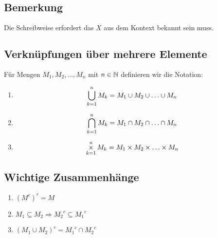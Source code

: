 \subsection{Bemerkung}
Die Schreibweise erfordert das $X$ aus dem Kontext bekannt sein muss.

\subsection{Verknüpfungen über mehrere Elemente}
Für Mengen $M_1, M_2, \ldots, M_n$ mit $n \in \mathbb{N}$ definieren wir die Notation:
\begin{enumerate}[label= (\alph*)]
    \item
        \begin{equation*}
            \mathop{\bigcup}\displaylimits_{k=1}^n M_k = M_1 \cup M_2 \cup \ldots \cup M_n
        \end{equation*}
    \item
        \begin{equation*}
            \mathop{\bigcap}\displaylimits_{k=1}^n M_k = M_1 \cap M_2 \cap \ldots \cap M_n
        \end{equation*}
    \item
        \begin{equation*}
            \mathop{\times}\displaylimits_{k=1}^n M_k = M_1 \times M_2 \times \ldots \times M_n
        \end{equation*}
\end{enumerate}

\subsection{Wichtige Zusammenhänge}
\begin{enumerate}[label= (\alph*)]
    \item ${(M^c)}^c = M$
    \item $M_1 \subseteq M_2 \Rightarrow {M_2}^c \subseteq {M_1}^c$
    \item ${(M_1 \cup M_2)}^c = {M_1}^c \cap {M_2}^c$
\end{enumerate}

